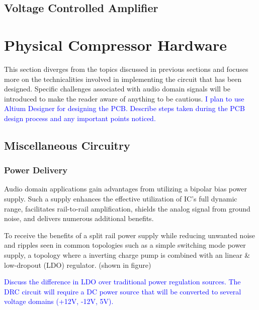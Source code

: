 \documentclass[10pt]{article}
\begin{document}
\begin{multicols*}{2}
            \subsection{Voltage Controlled Amplifier}

        \section{Physical Compressor Hardware}
            This section diverges from the topics discussed in previous sections and focuses more on the technicalities involved in implementing the circuit that has been designed. Specific challenges associated with audio domain signals will be introduced to make the reader aware of anything to be cautious.
            \textcolor{blue}{I plan to use Altium Designer for designing the PCB. Describe steps taken during the PCB design process and any important points noticed.}

            \subsection{Miscellaneous Circuitry}

                \subsubsection{Power Delivery}
                    Audio domain applications gain advantages from utilizing a bipolar bias power supply. Such a supply enhances the effective utilization of IC's full dynamic range, facilitates rail-to-rail amplification, shields the analog signal from ground noise, and delivers numerous additional benefits. \cite{ti-3-v-rails}\par
                    To receive the benefits of a split rail power supply while reducing unwanted noise and ripples seen in common topologies such as a simple switching mode power supply, a topology where a inverting charge pump is combined with an linear \& low-dropout (LDO) regulator. (shown in figure)\par
                    \textcolor{blue}{Discuss the difference in LDO over traditional power regulation sources. The DRC circuit will require a DC power source that will be converted to several voltage domains (+12V, -12V, 5V).}
                    
                    \noindent
                    \begin{minipage}{\linewidth}


\end{minipage}
\end{multicols*}
\end{document}
